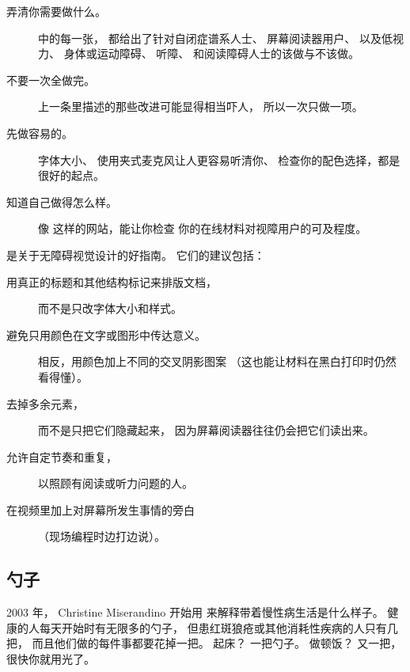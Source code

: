 \begin{description}

\item[弄清你需要做什么。]
  中的每一张，
  都给出了针对自闭症谱系人士、
  屏幕阅读器用户、
  以及低视力、
  身体或运动障碍、
  听障、
  和阅读障碍人士的该做与不该做。

\item[不要一次全做完。]
  上一条里描述的那些改进可能显得相当吓人，
  所以一次只做一项。

\item[先做容易的。]
  字体大小、
  使用夹式麦克风让人更容易听清你、
  检查你的配色选择，都是很好的起点。

\item[知道自己做得怎么样。]
  像  这样的网站，能让你检查
  你的在线材料对视障用户的可及程度。

\end{description}

\cite{Coom2012,Burg2015}是关于无障碍视觉设计的好指南。
它们的建议包括：

\begin{description}

\item[用真正的标题和其他结构标记来排版文档，]
  而不是只改字体大小和样式。

\item[避免只用颜色在文字或图形中传达意义。]
  相反，用颜色加上不同的交叉阴影图案
  （这也能让材料在黑白打印时仍然看得懂）。

\item[去掉多余元素，]
  而不是只把它们隐藏起来，
  因为屏幕阅读器往往仍会把它们读出来。

\item[允许自定节奏和重复，]
  以照顾有阅读或听力问题的人。

\item[在视频里加上对屏幕所发生事情的旁白]
  （现场编程时边打边说）。

\end{description}

\subsection*{勺子}

2003 年，
Christine Miserandino 开始用
来解释带着慢性病生活是什么样子。
健康的人每天开始时有无限多的勺子，
但患红斑狼疮或其他消耗性疾病的人只有几把，
而且他们做的每件事都要花掉一把。
起床？
一把勺子。
做顿饭？
又一把，很快你就用光了。

